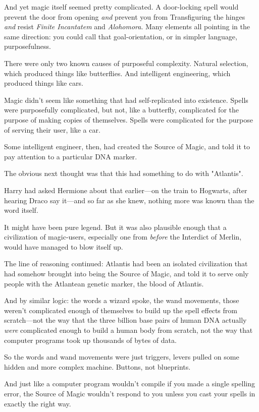And yet magic itself seemed pretty complicated. A door-locking spell would
prevent the door from opening \emph{and} prevent you from Transfiguring the
hinges \emph{and} resist \emph{Finite Incantatem} and \emph{Alohomora}. Many
elements all pointing in the same direction: you could call that
goal-orientation, or in simpler language, purposefulness.

There were only two known causes of purposeful complexity. Natural selection,
which produced things like butterflies. And intelligent engineering, which
produced things like cars.

Magic didn't seem like something that had self-replicated into existence.
Spells were purposefully complicated, but not, like a butterfly, complicated
for the purpose of making copies of themselves. Spells were complicated for the
purpose of serving their user, like a car.

Some intelligent engineer, then, had created the Source of Magic, and told it
to pay attention to a particular DNA marker.

The obvious next thought was that this had something to do with "Atlantis".

Harry had asked Hermione about that earlier---on the train to Hogwarts, after
hearing Draco say it---and so far as she knew, nothing more was known than the
word itself.

It might have been pure legend. But it was also plausible enough that a
civilization of magic-users, especially one from \emph{before} the Interdict of
Merlin, would have managed to blow itself up.

The line of reasoning continued: Atlantis had been an isolated civilization
that had somehow brought into being the Source of Magic, and told it to serve
only people with the Atlantean genetic marker, the blood of Atlantis.

And by similar logic: the words a wizard spoke, the wand movements, those
weren't complicated enough of themselves to build up the spell effects from
scratch---not the way that the three billion base pairs of human DNA actually
\emph{were} complicated enough to build a human body from scratch, not the way
that computer programs took up thousands of bytes of data.

So the words and wand movements were just triggers, levers pulled on some
hidden and more complex machine. Buttons, not blueprints.

And just like a computer program wouldn't compile if you made a single spelling
error, the Source of Magic wouldn't respond to you unless you cast your spells
in exactly the right way.

